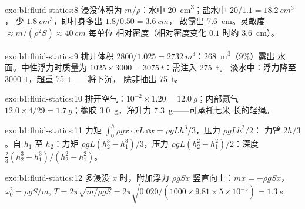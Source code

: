 \begin{solution}{exo:b1:fluid-statics:8}
浸没体积为 $m/\rho$：水中 \qty{20}{cm^3}；盐水中 $20/1.1 = \qty{18.2}{cm^3}$，
少 $\qty{1.8}{cm^3}$，即杆身多出 $1.8/0.50 = \qty{3.6}{cm}$，
故露出 \qty{7.6}{cm}。灵敏度 $\approx m/(\rho^2S) \approx \qty{40}{cm}$ 每单位
相对密度（相对密度变化 $0.1$ 时约 \qty{3.6}{cm}）。
\end{solution}

\begin{solution}{exo:b1:fluid-statics:9}
排开体积 $2800/1.025 = \qty{2732}{m^3}$：\qty{268}{m^3}（$9\%$）露出
水面。中性浮力时质量为 $1025 \times 3000 = \qty{3075}{t}$：需注入 \qty{275}{t}。
淡水中：浮力降至 \qty{3000}{t}，超重 \qty{75}{t}——将下沉，
除非抽出 \qty{75}{t}。
\end{solution}

\begin{solution}{exo:b1:fluid-statics:10}
排开空气：$10^{-2} \times 1.20 = \qty{12.0}{g}$；内部氦气 $12.0 \times
4/29 = \qty{1.7}{g}$；橡胶 \qty{3.0}{g}，净升力 \qty{7.3}{g}——可承托七米
长的轻绳。
\end{solution}

\begin{solution}{exo:b1:fluid-statics:11}
力矩 $\int_0^h\rho gx\cdot xL\,\dd x = \rho gLh^3/3$，压力 $\rho gLh^2/2$：
力臂 $2h/3$。自 $h_1$ 至 $h_2$：力矩 $\rho gL(h_2^3 - h_1^3)/3$，压力
$\rho gL(h_2^2 - h_1^2)/2$：深度 $\frac23(h_2^3 - h_1^3)/(h_2^2 - h_1^2)$。
\end{solution}

\begin{solution}{exo:b1:fluid-statics:12}
多浸没 $x$ 时，附加浮力 $\rho gSx$ 竖直向上：$m\ddot x = -\rho gSx$，
$\omega_0^2 = \rho gS/m$, $T = 2\pi\sqrt{m/\rho gS} = 2\pi\sqrt{0.020/(1000 \times
9.81 \times 5\times10^{-5})} = \qty{1.3}{s}$.
\end{solution}

